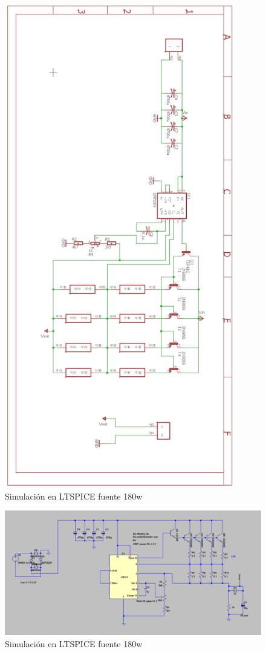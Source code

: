 \begin{figure}[H]
\centering
\includegraphics[width=10cm]{Capitulo3/figs/fuente.png}
\caption{Simulación en LTSPICE fuente 180w}
\end{figure}

\begin{figure}[H]
\centering
\includegraphics[width=12cm]{Capitulo3/figs/SIMFUENTE.png}
\caption{Simulación en LTSPICE fuente 180w}
\end{figure}




